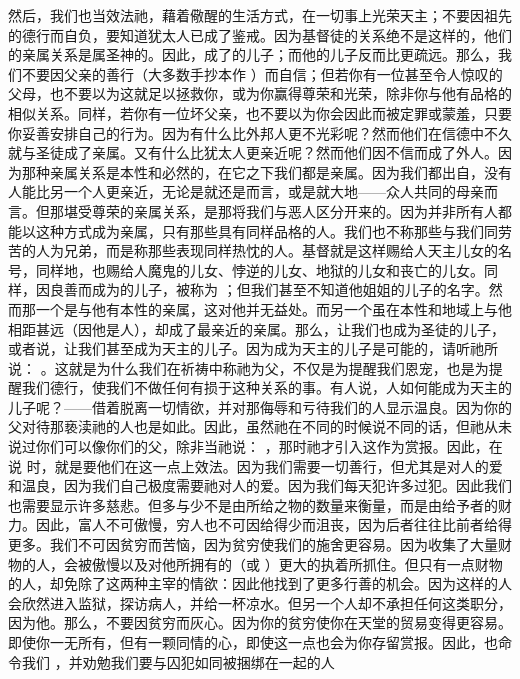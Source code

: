 然后，我们也当效法祂，藉着儆醒的生活方式，在一切事上光荣天主；不要因祖先的德行而自负，要知道犹太人已成了鉴戒。因为基督徒的关系绝不是这样的，他们的亲属关系是属圣神的。因此，成了的儿子；而他的儿子反而比更疏远。那么，我们不要因父亲的善行（大多数手抄本作  ）而自信；但若你有一位甚至令人惊叹的父母，也不要以为这就足以拯救你，或为你赢得尊荣和光荣，除非你与他有品格的相似关系。同样，若你有一位坏父亲，也不要以为你会因此而被定罪或蒙羞，只要你妥善安排自己的行为。因为有什么比外邦人更不光彩呢？然而他们在信德中不久就与圣徒成了亲属。又有什么比犹太人更亲近呢？然而他们因不信而成了外人。因为那种亲属关系是本性和必然的，在它之下我们都是亲属。因为我们都出自，没有人能比另一个人更亲近，无论是就还是而言，或是就大地——众人共同的母亲而言。但那堪受尊荣的亲属关系，是那将我们与恶人区分开来的。因为并非所有人都能以这种方式成为亲属，只有那些具有同样品格的人。我们也不称那些与我们同劳苦的人为兄弟，而是称那些表现同样热忱的人。基督就是这样赐给人天主儿女的名号，同样地，也赐给人魔鬼的儿女、悖逆的儿女、地狱的儿女和丧亡的儿女。同样，因良善而成为的儿子，被称为   ；但我们甚至不知道他姐姐的儿子的名字。然而那一个是与他有本性的亲属，这对他并无益处。而另一个虽在本性和地域上与他相距甚远（因他是人），却成了最亲近的亲属。那么，让我们也成为圣徒的儿子，或者说，让我们甚至成为天主的儿子。因为成为天主的儿子是可能的，请听祂所说：   。这就是为什么我们在祈祷中称祂为父，不仅是为提醒我们恩宠，也是为提醒我们德行，使我们不做任何有损于这种关系的事。有人说，人如何能成为天主的儿子呢？——借着脱离一切情欲，并对那侮辱和亏待我们的人显示温良。因为你的父对待那亵渎祂的人也是如此。因此，虽然祂在不同的时候说不同的话，但祂从未说过你们可以像你们的父，除非当祂说：   ，那时祂才引入这作为赏报。因此，在说   时，就是要他们在这一点上效法。因为我们需要一切善行，但尤其是对人的爱和温良，因为我们自己极度需要祂对人的爱。因为我们每天犯许多过犯。因此我们也需要显示许多慈悲。但多与少不是由所给之物的数量来衡量，而是由给予者的财力。因此，富人不可傲慢，穷人也不可因给得少而沮丧，因为后者往往比前者给得更多。我们不可因贫穷而苦恼，因为贫穷使我们的施舍更容易。因为收集了大量财物的人，会被傲慢以及对他所拥有的（或  ）更大的执着所抓住。但只有一点财物的人，却免除了这两种主宰的情欲：因此他找到了更多行善的机会。因为这样的人会欣然进入监狱，探访病人，并给一杯凉水。但另一个人却不承担任何这类职分，因为他。那么，不要因贫穷而灰心。因为你的贫穷使你在天堂的贸易变得更容易。即使你一无所有，但有一颗同情的心，即使这一点也会为你存留赏报。因此，也命令我们   ，并劝勉我们要与囚犯如同被捆绑在一起的人  